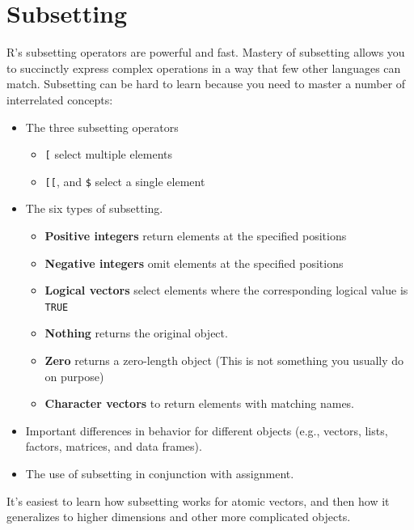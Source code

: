 \documentclass[]{book}
\providecommand{\tightlist}{%
  \setlength{\itemsep}{0pt}\setlength{\parskip}{0pt}}
\theoremstyle{definition}
\theoremstyle{definition}
\theoremstyle{definition}
\theoremstyle{remark}
\begin{document}
\hypertarget{subsetting}{%
\chapter{Subsetting}\label{subsetting}}

R's subsetting operators are powerful and fast. Mastery of subsetting
allows you to succinctly express complex operations in a way that few
other languages can match. Subsetting can be hard to learn because you
need to master a number of interrelated concepts:

\begin{itemize}
\item
  The three subsetting operators

  \begin{itemize}
  \tightlist
  \item
    \texttt{{[}} select multiple elements
  \item
    \texttt{{[}{[}}, and \texttt{\$} select a single element
  \end{itemize}
\item
  The six types of subsetting.

  \begin{itemize}
  \tightlist
  \item
    \textbf{Positive integers} return elements at the specified
    positions
  \item
    \textbf{Negative integers} omit elements at the specified positions
  \item
    \textbf{Logical vectors} select elements where the corresponding
    logical value is \texttt{TRUE}
  \item
    \textbf{Nothing} returns the original object.
  \item
    \textbf{Zero} returns a zero-length object (This is not something
    you usually do on purpose)
  \item
    \textbf{Character vectors} to return elements with matching names.
  \end{itemize}
\item
  Important differences in behavior for different objects (e.g.,
  vectors, lists, factors, matrices, and data frames).
\item
  The use of subsetting in conjunction with assignment.
\end{itemize}

It's easiest to learn how subsetting works for atomic vectors, and then
how it generalizes to higher dimensions and other more complicated
objects.
\end{document}
